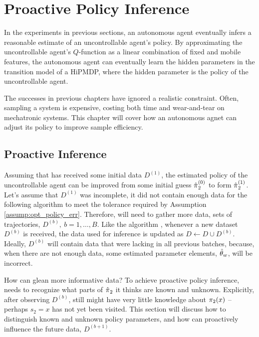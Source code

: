 \chapter{Proactive Policy Inference}\label{chapt:proactive_inference}

In the experiments in previous sections, an autonomous agent eventually infers a reasonable estimate of an
uncontrollable agent's policy. By approximating the uncontrollable agent's $Q$-function as a linear combination of fixed
and mobile features, the autonomous agent can eventually learn the hidden parameters in the transition model of a
\ac{HiPMDP}, where the hidden parameter is the policy of the uncontrollable agent.

The successes in previous chapters have ignored a realistic constraint. Often, sampling a system is expensive, costing
both time and wear-and-tear on mechatronic systems. This chapter will cover how an autonomous agnet can adjust its
policy to improve sample efficiency.

\section{Proactive Inference}

Assuming that  has received some initial data $D^{(1)}$, the estimated policy of the uncontrollable agent
can be improved from some initial guess $\hat{\pi_{}}_2^{(0)}$ to form $\hat{\pi_{}}_2^{(1)}$. Let's
assume that $D^{(1)}$ was incomplete, it did not contain enough data for the following algorithm to meet the
tolerance required by Assumption \ref{assump:opt_policy_err}. Therefore,  will need to gather more data, sets
of trajectories, $D^{(b)},\ b=1,\ldots,B$. Like the \DAGGER algorithm \cite{ross2011reduction}, whenever a new dataset
$D^{(b)}$ is received, the data used for inference is updated as $D\leftarrow D\cup D^{(b)}$. Ideally, $D^{(b)}$ will
contain data that were lacking in all previous batches, because, when there are not enough data, some estimated
parameter elements, $\hat{\theta}_{w}$, will be incorrect.

How can  glean more informative data? To achieve proactive policy inference,  needs to recognize what
parts of $\hat{\pi_{}}_2$ it thinks are known and unknown. Explicitly, after observing $D^{(b)}$, 
still might have very little knowledge about $\pi_{2}(x)$ -- perhaps $s_2=x$ has not yet been visited. This section
will discuss how to distinguish known and unknown policy parameters, and how  can proactively influence the
future data, $D^{(b+1)}$.

